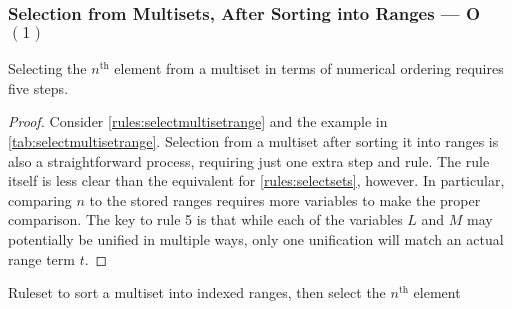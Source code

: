 \subsubsection{Selection from Multisets, After Sorting into Ranges --- O\((1)\)}\label{sec:selectmultisetrange}

\begin{proposition}\label{prop:selectmultisetrange}
Selecting the \(n^{\text{th}}\) element from a multiset in terms of numerical ordering requires five steps.
\end{proposition}

\begin{proof}
Consider \cref{rules:selectmultisetrange} and the example in \cref{tab:selectmultisetrange}.  Selection from a multiset after sorting it into ranges is also a straightforward process, requiring just one extra step and rule.  The rule itself is less clear than the equivalent for \cref{rules:selectsets}, however.  In particular, comparing \(n\) to the stored ranges requires more variables to make the proper comparison.  The key to rule 5 is that while each of the variables \(L\) and \(M\) may potentially be unified in multiple ways, only one unification will match an actual range term \(t\).  
\end{proof}

\cpresetrulenumber
\begin{cprulesetfloat}
\begin{cpruleset}





\end{cpruleset}
\caption{\label{rules:selectmultisetrange}Ruleset to sort a multiset into indexed ranges, then select the \(n^{\text{th}}\) element}
\end{cprulesetfloat}

